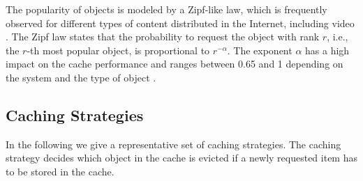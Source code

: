 The popularity of objects is modeled by a Zipf-like law, which is frequently observed for different types of content distributed in the Internet, including video \cite{gill2007youtube,cha2009analyzing}.
The Zipf law states that the probability to request the object with rank $r$, i.e., the $r$-th most popular object, is proportional to $r^{-\alpha}$.
The exponent $\alpha$ has a high impact on the cache performance and ranges between 0.65 and 1 depending on the system and the type of object \cite{fricker2012impact}.

\subsection{Caching Strategies}\label{sec:hierarchical:background:strategies}

In the following we give a representative set of caching strategies.
The caching strategy decides which object in the cache is evicted if a newly requested item has to be stored in the cache.

